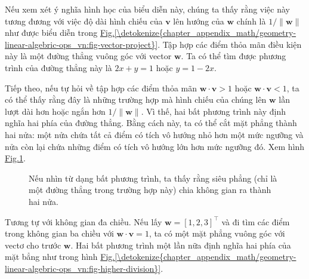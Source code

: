 \documentclass[letterpaper,11pt,english]{sphinxmanual}
\begin{document}
Nếu xem xét ý nghĩa hình học của biểu diễn này, chúng ta thấy rằng việc
này tương đương với việc độ dài hình chiếu của \(\mathbf{v}\) lên
hướng của \(\mathbf{w}\) chính là \(1/\|\mathbf{w}\|\) như được
biểu diễn trong \hyperref[\detokenize{chapter_appendix_math/geometry-linear-algebric-ops_vn:fig-vector-project}]{Fig.\@ \ref{\detokenize{chapter_appendix_math/geometry-linear-algebric-ops_vn:fig-vector-project}}}. Tập hợp các điểm thỏa
mãn điều kiện này là một đường thẳng vuông góc với vector
\(\mathbf{w}\). Ta có thể tìm được phương trình của đường thẳng này
là \(2x + y = 1\) hoặc \(y = 1 - 2x\).







Tiếp theo, nếu tự hỏi về tập hợp các điểm thỏa mãn
\(\mathbf{w}\cdot\mathbf{v} > 1\) hoặc
\(\mathbf{w}\cdot\mathbf{v} < 1\), ta có thể thấy rằng đây là những
trường hợp mà hình chiếu của chúng lên \(\mathbf{w}\) lần lượt dài
hơn hoặc ngắn hơn \(1/\|\mathbf{w}\|\). Vì thế, hai bất phương trình
này định nghĩa hai phía của đường thẳng. Bằng cách này, ta có thể cắt
mặt phẳng thành hai nửa: một nửa chứa tất cả điểm có tích vô hướng nhỏ
hơn một mức ngưỡng và nửa còn lại chứa những điểm có tích vô hướng lớn
hơn mức ngưỡng đó. Xem hình \hyperref[\detokenize{chapter_appendix_math/geometry-linear-algebric-ops_vn:fig-space-division}]{Fig.\@ \ref{\detokenize{chapter_appendix_math/geometry-linear-algebric-ops_vn:fig-space-division}}}.



\begin{figure}[H]
\centering
\capstart

\noindent{}
\caption{Nếu nhìn từ dạng bất phương trình, ta thấy rằng siêu phẳng (chỉ là
một đường thẳng trong trường hợp này) chia không gian ra thành hai
nửa.}\label{\detokenize{chapter_appendix_math/geometry-linear-algebric-ops_vn:id8}}\label{\detokenize{chapter_appendix_math/geometry-linear-algebric-ops_vn:fig-space-division}}\end{figure}



Tương tự với không gian đa chiều. Nếu lấy
\(\mathbf{w} = [1,2,3]^\top\) và đi tìm các điểm trong không gian ba
chiều với \(\mathbf{w}\cdot\mathbf{v} = 1\), ta có một mặt phẳng
vuông góc với vectơ cho trước \(\mathbf{w}\). Hai bất phương trình
một lần nữa định nghĩa hai phía của mặt bẳng như trong hình
\hyperref[\detokenize{chapter_appendix_math/geometry-linear-algebric-ops_vn:fig-higher-division}]{Fig.\@ \ref{\detokenize{chapter_appendix_math/geometry-linear-algebric-ops_vn:fig-higher-division}}}.
\end{document}
